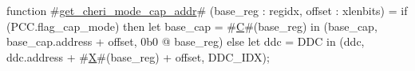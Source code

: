 function #\hyperref[sailRISCVzgetzycherizymodezycapzyaddr]{get\_cheri\_mode\_cap\_addr}# (base_reg : regidx, offset : xlenbits) = {
  if (PCC.flag_cap_mode) then
    let base_cap = #\hyperref[sailRISCVzC]{C}#(base_reg) in
    (base_cap, base_cap.address + offset, 0b0 @ base_reg)
  else
    let ddc = DDC in
    (ddc, ddc.address + #\hyperref[sailRISCVzX]{X}#(base_reg) + offset, DDC_IDX);
}
